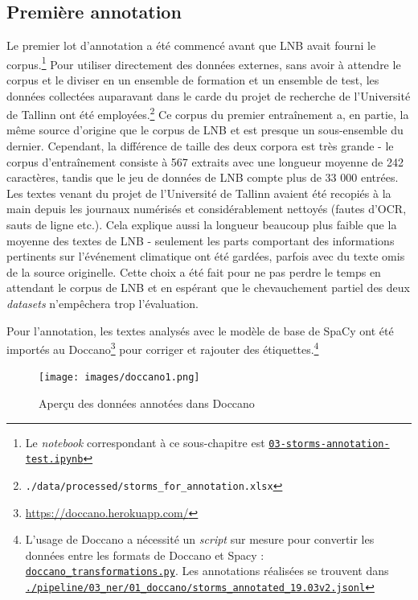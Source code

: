 \documentclass[a4paper,twoside,12pt]{article}
\begin{document}
\subsection{Première annotation}

Le premier lot d'annotation a été commencé avant que LNB avait fourni le corpus.\footnote{Le \textit{notebook} correspondant à ce sous-chapitre est \href{https://github.com/krkryger/clim-dist/blob/main/notebooks/03-storms-annotation-test.ipynb}{\texttt{03-storms-annotation-test.ipynb}}} Pour utiliser directement des données externes, sans avoir à attendre le corpus et le diviser en un ensemble de formation et un ensemble de test, les données collectées auparavant dans le carde du projet de recherche de l'Université de Tallinn ont été employées.\footnote{\texttt{./data/processed/storms\_for\_annotation.xlsx}} Ce corpus du premier entraînement a, en partie, la même source d'origine que le corpus de LNB et est presque un sous-ensemble du dernier. Cependant, la différence de taille des deux corpora est très grande - le corpus d'entraînement consiste à 567 extraits avec une longueur moyenne de 242 caractères, tandis que le jeu de données de LNB compte plus de 33 000 entrées. Les textes venant du projet de l'Université de Tallinn avaient été recopiés à la main depuis les journaux numérisés et considérablement nettoyés (fautes d'OCR, sauts de ligne etc.). Cela explique aussi la longueur beaucoup plus faible que la moyenne des textes de LNB - seulement les parts comportant des informations pertinents sur l'événement climatique ont été gardées, parfois avec du texte omis de la source originelle. Cette choix a été fait pour ne pas perdre le temps en attendant le corpus de LNB et en espérant que le chevauchement partiel des deux \textit{datasets} n'empêchera trop l'évaluation.

Pour l'annotation, les textes analysés avec le modèle de base de SpaCy ont été importés au Doccano\footnote{\url{https://doccano.herokuapp.com/}} pour corriger et rajouter des étiquettes.\footnote{L'usage de Doccano a nécessité un \textit{script} sur mesure pour convertir les données entre les formats de Doccano et Spacy : \href{https://github.com/krkryger/clim-dist/blob/main/climdist/ner/doccano_transformations.py}{\texttt{doccano\_transformations.py}}. Les annotations réalisées se trouvent dans \href{https://github.com/krkryger/clim-dist/blob/main/pipeline/03_ner/01_doccano/storms_annotated_19.03v2.jsonl}{\texttt{./pipeline/03\_ner/01\_doccano/storms\_annotated\_19.03v2.jsonl}}}

\begin{figure}[h]
    \centering
    \texttt{[image: images/doccano1.png]}
    \caption{Aperçu des données annotées dans Doccano}
    \label{fig:doccano1}
\end{figure}
\end{document}
